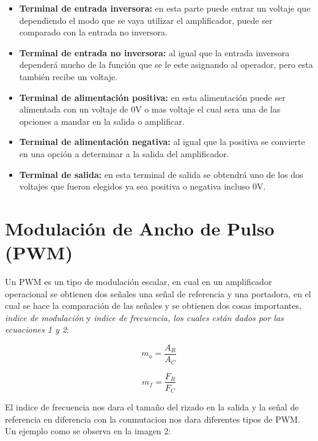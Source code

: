 \documentclass[11pt,a4paper]{article}
\begin{document}
\begin{itemize}

\item \textbf{Terminal de entrada inversora:} en esta parte puede entrar un voltaje que dependiendo el modo que se vaya utilizar el amplificador, puede ser comparado con la entrada no inversora.

\item \textbf{Terminal de entrada no inversora:} al igual que la entrada inversora dependerá mucho de la función que se le este asignando al operador, pero esta también recibe un voltaje.

\item \textbf{Terminal de alimentación positiva:} en esta alimentación puede ser alimentada con un voltaje de 0V o mas voltaje el cual sera una de las opciones a mandar en la salida o amplificar.

\item \textbf{Terminal de alimentación negativa:} al igual que la positiva se convierte en una opción a determinar a la salida del amplificador.

\item \textbf{Terminal de salida:} en esta terminal de salida se obtendrá uno de los dos voltajes que fueron elegidos ya sea positiva o negativa incluso 0V.

\end{itemize}


\section{Modulación de Ancho de Pulso (PWM)}

Un PWM es un tipo de modulación escalar, en cual en un amplificador operacional se obtienen dos señales una señal de referencia y una portadora, en el cual se hace la comparación de las señales y se obtienen dos cosas importantes, \emph{indice de modulación} y \emph{indice de frecuencia, los cuales están dados por las ecuaciones 1 y 2}:

\begin{equation}
m_a=\frac{A_R}{A_C}
\end{equation}

\begin{equation}
m_f=\frac{F_R}{F_C}
\end{equation}

El indice de frecuencia nos dara el tamaño del rizado en la salida y la señal de referencia en diferencia con la conmutacion nos dara diferentes tipos de PWM. Un ejemplo como se observa en la imagen 2:\cite{coughlin1999amplificadores}
\end{document}
